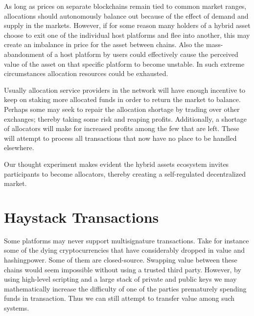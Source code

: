 \documentclass[a4paper]{article}
\begin{document}
As long as prices on separate blockchains remain tied to common market ranges, allocations should autonomously balance out because of the effect of demand and supply in the markets. However, if for some reason many holders of a hybrid asset choose to exit one of the individual host platforms and flee into another, this may create an imbalance in price for the asset between chains. Also the mass-abandonment of a host platform by users could effectively cause the perceived value of the asset on that specific platform to become unstable. In such extreme circumstances allocation resources could be exhausted.

Usually allocation service providers in the \hybridd network will have enough incentive to keep on staking more allocated funds in order to return the market to balance. Perhaps some may seek to repair the allocation shortage by trading over other exchanges; thereby taking some risk and reaping profits. Additionally, a shortage of allocators will make for increased profits among the few that are left. These will attempt to process all transactions that now have no place to be handled elsewhere.

Our thought experiment makes evident the hybrid assets ecosystem invites participants to become allocators, thereby creating a self-regulated decentralized market.

\section{Haystack Transactions}

Some platforms may never support multisignature transactions. Take for instance some of the dying cryptocurrencies that have considerably dropped in value and hashingpower. Some of them are closed-source. Swapping value between these chains would seem impossible without using a trusted third party. However, by using high-level scripting and a large stack of private and public keys we may mathematically increase the difficulty of one of the parties prematurely spending funds in transaction. Thus we can still attempt to transfer value among such systems.
\end{document}
